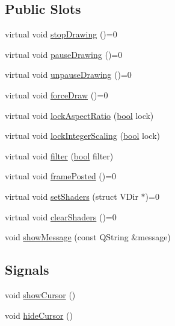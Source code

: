 \subsection*{Public Slots}
\begin{DoxyCompactItemize}
\item 
virtual void \mbox{\hyperlink{class_q_g_b_a_1_1_display_ad6176432272b711781318a371bfe1017}{stop\+Drawing}} ()=0
\item 
virtual void \mbox{\hyperlink{class_q_g_b_a_1_1_display_a448aca153530cd1dc530ae524dac2903}{pause\+Drawing}} ()=0
\item 
virtual void \mbox{\hyperlink{class_q_g_b_a_1_1_display_a31bbebac223ef11539ab5fa189893c89}{unpause\+Drawing}} ()=0
\item 
virtual void \mbox{\hyperlink{class_q_g_b_a_1_1_display_adf2115268d351928e9aea504f9fcf0c7}{force\+Draw}} ()=0
\item 
virtual void \mbox{\hyperlink{class_q_g_b_a_1_1_display_acad5a30d192f9207376208534036bbaa}{lock\+Aspect\+Ratio}} (\mbox{\hyperlink{libretro_8h_a4a26dcae73fb7e1528214a068aca317e}{bool}} lock)
\item 
virtual void \mbox{\hyperlink{class_q_g_b_a_1_1_display_a3d51766ed958524a3ba87a19ecc2f4f6}{lock\+Integer\+Scaling}} (\mbox{\hyperlink{libretro_8h_a4a26dcae73fb7e1528214a068aca317e}{bool}} lock)
\item 
virtual void \mbox{\hyperlink{class_q_g_b_a_1_1_display_a222d135f71325371e9ba824e0f00370f}{filter}} (\mbox{\hyperlink{libretro_8h_a4a26dcae73fb7e1528214a068aca317e}{bool}} filter)
\item 
virtual void \mbox{\hyperlink{class_q_g_b_a_1_1_display_ac60ec1f613bd782165ba3bdbe14d9439}{frame\+Posted}} ()=0
\item 
virtual void \mbox{\hyperlink{class_q_g_b_a_1_1_display_a9f50f9d1cd9bcb0b4b11999f022f27c0}{set\+Shaders}} (struct V\+Dir $\ast$)=0
\item 
virtual void \mbox{\hyperlink{class_q_g_b_a_1_1_display_a21c8a4e8bb18efe4e8e9cc6e71a765ee}{clear\+Shaders}} ()=0
\item 
void \mbox{\hyperlink{class_q_g_b_a_1_1_display_ab4e04e33416aafdc2a3455babf6bfdb4}{show\+Message}} (const Q\+String \&message)
\end{DoxyCompactItemize}
\subsection*{Signals}
\begin{DoxyCompactItemize}
\item 
void \mbox{\hyperlink{class_q_g_b_a_1_1_display_ad8e1af9c931a15f25f888bf0fe9c87c9}{show\+Cursor}} ()
\item 
void \mbox{\hyperlink{class_q_g_b_a_1_1_display_ae2ba6f816b6ed52108871e29b808b5b9}{hide\+Cursor}} ()
\end{DoxyCompactItemize}

